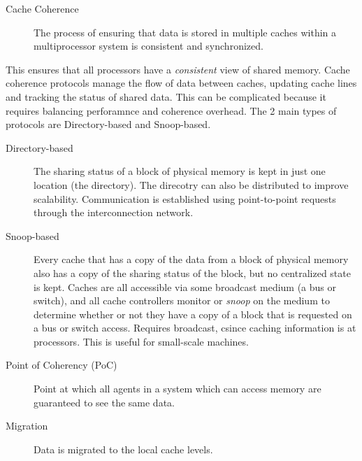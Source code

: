 \documentclass{article}
\begin{document}
\begin{itemize}
\begin{itemize}
              \begin{description}
                \item[Cache Coherence]
                  The process of ensuring that data is stored in multiple caches within a multiprocessor system is consistent and synchronized.
              \end{description}
              This ensures that all processors have a \textit{consistent} view of shared memory. Cache coherence protocols manage the flow of data between caches, updating cache lines and tracking the status of shared data. This can be complicated because it requires balancing perforamnce and coherence overhead. The 2 main types of protocols are Directory-based and Snoop-based.
              \begin{description}
                \item[Directory-based]
                  The sharing status of a block of physical memory is kept in just one location (the directory). The direcotry can also be distributed to improve scalability. Communication is established using point-to-point requests through the interconnection network.
              \end{description}
              \begin{description}
                \item[Snoop-based]
                  Every cache that has a copy of the data from a block of physical memory also has a copy of the sharing status of the block, but no centralized state is kept. Caches are all accessible via some broadcast medium (a bus or switch), and all cache controllers monitor or \textit{snoop} on the medium to determine whether or not they have a copy of a block that is requested on a bus or switch access. Requires broadcast, csince caching information is at processors. This is useful for small-scale machines.
              \end{description}
              \begin{description}
                \item[Point of Coherency (PoC)]
                  Point at which all agents in a system which can access memory are guaranteed to see the same data.
              \end{description}
              \begin{description}
                \item[Migration]
                  Data is migrated to the local cache levels.
              \end{description}

\end{itemize}
\end{itemize}
\end{document}
